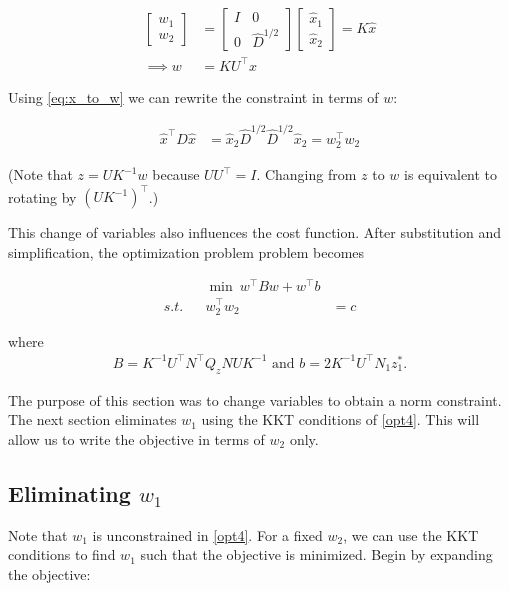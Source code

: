 \documentclass[conference]{IEEEtran}
\begin{document}
\begin{align}
\label{eq:x_to_w} \begin{bmatrix} w_1 \\ w_2 \end{bmatrix} &=
\begin{bmatrix} I & 0 \\ 0 & \hat{D}^{1/2} \end{bmatrix}
\begin{bmatrix} \hat{x}_1 \\ \hat{x}_2 \end{bmatrix} = K\hat{x} \\
\nonumber \implies w &= KU^\top x
\end{align}

Using \eqref{eq:x_to_w} we can rewrite the constraint in terms of $w$:

\begin{align}
\hat{x}^\top D\hat{x} &= \hat{x}_2\hat{D}^{1/2}\hat{D}^{1/2}\hat{x}_2 = w_2^\top w_2
\end{align}

(Note that $z = UK^{-1}w$ because $UU^\top = I$. Changing from $z$ to $w$
is equivalent to rotating by $(UK^{-1})^\top$.)

This change of variables also influences the cost function. After substitution and simplification, the optimization problem problem becomes

\begin{subequations}\label{opt4}
\begin{align}
\label{opt4:obj} && \min~ w^\top Bw + w^\top b \\
\label{opt4:quad} s.t. && w_2^\top w_2 &= c
\end{align}
\end{subequations}

where 
\begin{align*}
B= K^{-1}U^\top N^\top Q_z NUK^{-1} \text{ and }b=2 K^{-1}U^\top N_1z_1^*.
\end{align*}

The purpose of this section was to change variables to obtain a norm constraint. The next section eliminates $w_1$ using the KKT conditions of \eqref{opt4}. This will allow us to write the objective in terms of $w_2$ only.

\subsection{Eliminating $w_1$}

Note that $w_1$ is unconstrained in \eqref{opt4}. For a fixed $w_2$, we can use the KKT
conditions to find $w_1$ such that the objective is minimized. Begin by
expanding the objective:
\end{document}
